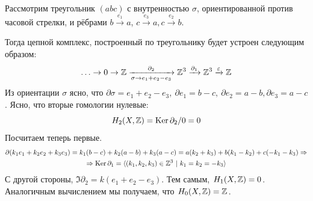     \begin{example}\label{ex2}
        Рассмотрим треугольник $(a b c)$ с внутренностью $\sigma$, ориентированной против часовой стрелки, и рёбрами $b \xrightarrow{e_1} a$, $c \xrightarrow{e_3} a, c \xrightarrow{e_2} b$.
        \begin{center}
        \end{center}
        Тогда цепной комплекс, построенный по треугольнику будет устроен следующим образом:
        \[ \ldots \to 0 \to \mathbb{Z} \xrightarrow[\sigma \to e_1 + e_2 - e_3]{\partial_{2}} \mathbb{Z}^3 \xrightarrow{\partial_1} \mathbb{Z}^3 \xrightarrow{\varepsilon} \mathbb{Z} \]
        Из ориентации $\sigma$ ясно, что $\partial \sigma = e_1 + e_2 - e_3, \ \partial e_1 = b - c, \ \partial e_2 = a - b, \partial e_3 = a - c$.
        Ясно, что вторые гомологии нулевые:
        \[ H_{2}(X, \mathbb{Z}) = \operatorname{Ker}{\partial_{2}}/0 = 0\]
        Посчитаем теперь первые.
        \begin{multline*} \partial(k_1 e_1 + k_2 e_2 + k_3 e_3) =  k_1(b - c) + k_2(a - b) + k_3(a - c) = a(k_2 + k_3) + b(k_1 - k_2) + c(-k_1 - k_3) \Rightarrow \\ \Rightarrow \operatorname{Ker}\partial_{1} = \langle (k_1, k_2, k_3) \in \mathbb{Z}^3 \ \vert \ k_1 = k_2 = -k_3 \rangle \end{multline*}
        С другой стороны, $\Im{\partial_{2}} = k(e_1 + e_2 - e_3)$. Тем самым, $H_{1}(X, \mathbb{Z}) = 0$. Аналогичным вычислением мы получаем, что $H_{0}(X, \mathbb{Z}) = \mathbb{Z}$.
    \end{example}

